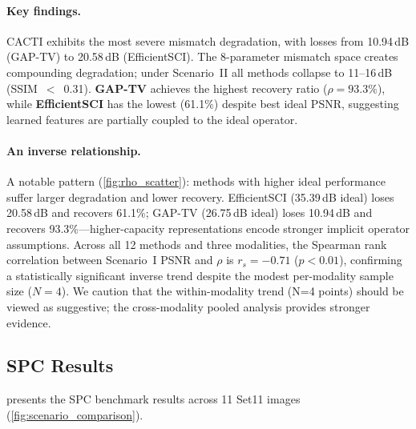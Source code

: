 \documentclass[runningheads]{llncs}
\begin{document}
\paragraph{Key findings.}
CACTI exhibits the most severe mismatch degradation, with losses from 10.94\,dB (GAP-TV) to 20.58\,dB (EfficientSCI).
The 8-parameter mismatch space creates compounding degradation; under Scenario~II all methods collapse to 11--16\,dB (SSIM~$<$~0.31).
\textbf{GAP-TV} achieves the highest recovery ratio ($\rho = 93.3\%$), while \textbf{EfficientSCI} has the lowest (61.1\%) despite best ideal PSNR, suggesting learned features are partially coupled to the ideal operator.

\paragraph{An inverse relationship.}
A notable pattern (\cref{fig:rho_scatter}): methods with higher ideal performance suffer larger degradation and lower recovery.
EfficientSCI (35.39\,dB ideal) loses 20.58\,dB and recovers 61.1\%; GAP-TV (26.75\,dB ideal) loses 10.94\,dB and recovers 93.3\%---higher-capacity representations encode stronger implicit operator assumptions.
Across all 12 methods and three modalities, the Spearman rank correlation between Scenario~I PSNR and $\rho$ is $r_s = -0.71$ ($p < 0.01$), confirming a statistically significant inverse trend despite the modest per-modality sample size ($N{=}4$).
We caution that the within-modality trend (N=4 points) should be viewed as suggestive; the cross-modality pooled analysis provides stronger evidence.

\subsection{SPC Results}
\label{sec:spc_results}

 presents the SPC benchmark results across 11 Set11 images (\cref{fig:scenario_comparison}).
\end{document}
